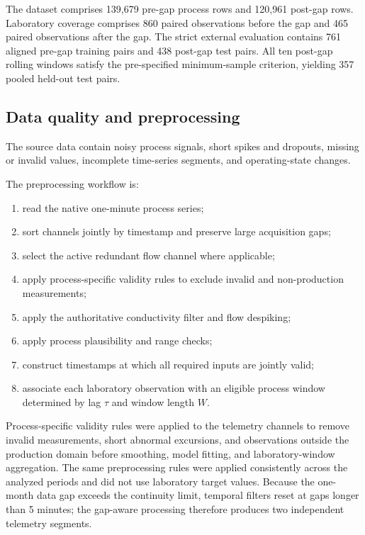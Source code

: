 \documentclass[11pt]{article}
\begin{document}
The dataset comprises 139,679 pre-gap process rows and 120,961 post-gap rows. Laboratory coverage comprises 860 paired observations before the gap and 465 paired observations after the gap. The strict external evaluation contains 761 aligned pre-gap training pairs and 438 post-gap test pairs. All ten post-gap rolling windows satisfy the pre-specified minimum-sample criterion, yielding 357 pooled held-out test pairs.

\subsection{Data quality and preprocessing}

The source data contain noisy process signals, short spikes and dropouts, missing or invalid values, incomplete time-series segments, and operating-state changes. 

The preprocessing workflow is:
\begin{enumerate}[leftmargin=1.8em]
\item read the native one-minute process series;
\item sort channels jointly by timestamp and preserve large acquisition gaps;
\item select the active redundant flow channel where applicable;
\item apply process-specific validity rules to exclude invalid and non-production measurements;
\item apply the authoritative conductivity filter and flow despiking;
\item apply process plausibility and range checks;
\item construct timestamps at which all required inputs are jointly valid;
\item associate each laboratory observation with an eligible process window determined by lag $\tau$ and window length $W$.
\end{enumerate}

Process-specific validity rules were applied to the telemetry channels to remove invalid measurements, short abnormal excursions, and observations outside the production domain before smoothing, model fitting, and laboratory-window aggregation. The same preprocessing rules were applied consistently across the analyzed periods and did not use laboratory target values. Because the one-month data gap exceeds the continuity limit, temporal filters reset at gaps longer than 5 minutes; the gap-aware processing therefore produces two independent telemetry segments.
\end{document}
